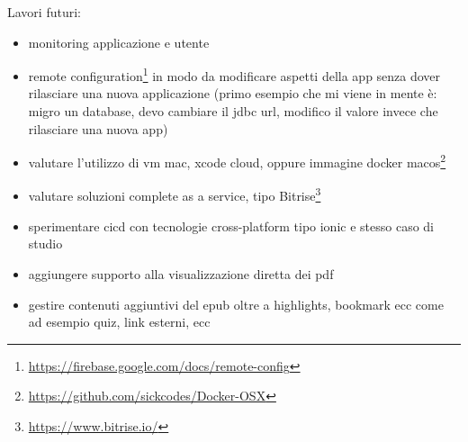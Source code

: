 
Lavori futuri: 
\begin{itemize}
    \item monitoring applicazione e utente
    \item remote configuration\footnote{\url{https://firebase.google.com/docs/remote-config}} in modo da modificare aspetti della app senza dover rilasciare una nuova applicazione (primo esempio che mi viene in mente è: migro un database, devo cambiare il jdbc url, modifico il valore invece che rilasciare una nuova app)
    \item valutare l'utilizzo di vm mac, xcode cloud, oppure immagine docker macos\footnote{\url{https://github.com/sickcodes/Docker-OSX}}
    \item valutare soluzioni complete as a service, tipo Bitrise\footnote{\url{https://www.bitrise.io/}}
    \item sperimentare cicd con tecnologie cross-platform tipo ionic e stesso caso di studio
    \item aggiungere supporto alla visualizzazione diretta dei pdf
    \item gestire contenuti aggiuntivi del epub oltre a highlights, bookmark ecc come ad esempio quiz, link esterni, ecc
\end{itemize}
